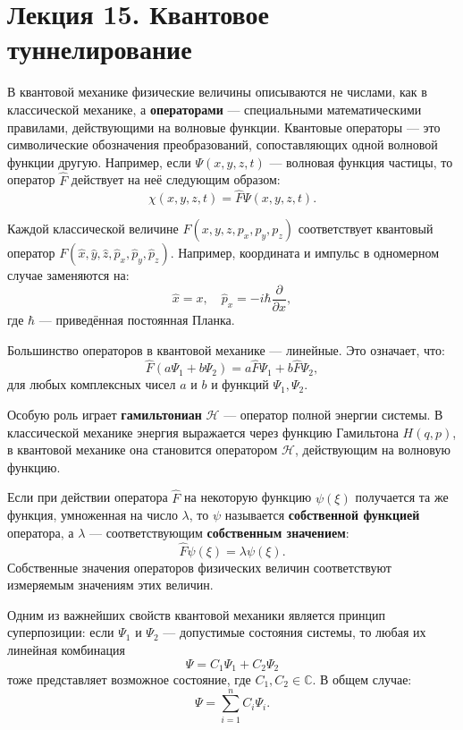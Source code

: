 \documentclass[12pt]{article}
\begin{document}






\section{Лекция 15. Квантовое туннелирование}

В квантовой механике физические величины описываются не числами, как в классической механике, а \textbf{операторами} — специальными математическими правилами, действующими на волновые функции. Квантовые операторы — это символические обозначения преобразований, сопоставляющих одной волновой функции другую. Например, если $\Psi(x, y, z, t)$ — волновая функция частицы, то оператор $\hat{F}$ действует на неё следующим образом:
\[
\chi(x, y, z, t) = \hat{F} \Psi(x, y, z, t).
\]

Каждой классической величине $F(x, y, z, p_x, p_y, p_z)$ соответствует квантовый оператор $F(\hat{x}, \hat{y}, \hat{z}, \hat{p}_x, \hat{p}_y, \hat{p}_z)$. Например, координата и импульс в одномерном случае заменяются на:
\[
\hat{x} = x, \quad \hat{p}_x = -i\hbar \frac{\partial}{\partial x},
\]
где $\hbar$ — приведённая постоянная Планка.

Большинство операторов в квантовой механике — линейные. Это означает, что:
\[
\hat{F}(a\Psi_1 + b\Psi_2) = a\hat{F}\Psi_1 + b\hat{F}\Psi_2,
\]
для любых комплексных чисел $a$ и $b$ и функций $\Psi_1, \Psi_2$.

Особую роль играет \textbf{гамильтониан} $\mathcal{H}$ — оператор полной энергии системы. В классической механике энергия выражается через функцию Гамильтона $H(q, p)$, в квантовой механике она становится оператором $\mathcal{H}$, действующим на волновую функцию.

Если при действии оператора $\hat{F}$ на некоторую функцию $\psi(\xi)$ получается та же функция, умноженная на число $\lambda$, то $\psi$ называется \textbf{собственной функцией} оператора, а $\lambda$ — соответствующим \textbf{собственным значением}:
\[
\hat{F} \psi(\xi) = \lambda \psi(\xi).
\]
Собственные значения операторов физических величин соответствуют измеряемым значениям этих величин.

Одним из важнейших свойств квантовой механики является принцип суперпозиции: если $\Psi_1$ и $\Psi_2$ — допустимые состояния системы, то любая их линейная комбинация
\[
\Psi = C_1 \Psi_1 + C_2 \Psi_2
\]
тоже представляет возможное состояние, где $C_1, C_2 \in \mathbb{C}$. В общем случае:
\[
\Psi = \sum_{i=1}^n C_i \Psi_i.
\]
\end{document}
